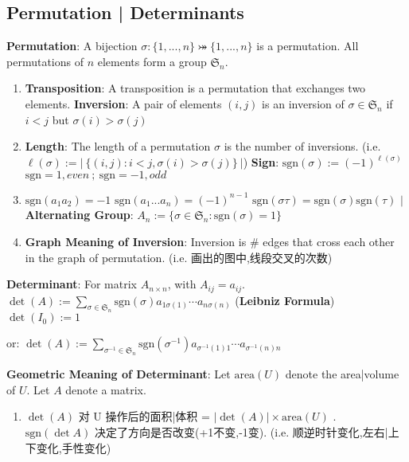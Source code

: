 \documentclass[9pt]{article}
\begin{document}
\subsection{Permutation | Determinants} %

\textbf{Permutation}: A bijection $\sigma:\{1,...,n\}\bij\{1,...,n\}$ is a permutation. \qquad \qquad All permutations of $n$ elements form a group $\mathfrak{S}_n$.

\begin{enumerate}[itemsep=-2pt, topsep=-2pt]
    \item {\scriptsize \textbf{Transposition}: A transposition is a permutation that exchanges two elements. \qquad \textbf{Inversion}: A pair of elements $(i,j)$ is an inversion of $\sigma\in\mathfrak{S}_n$ if $i<j$ but $\sigma(i)>\sigma(j)$}
    \item {\scriptsize \textbf{Length}: The length of a permutation $\sigma$ is the number of inversions. (i.e. $\ell(\sigma):=\left|\ \{(i,j):i<j,\sigma(i)>\sigma(j)\}\ \right|$) \qquad \textbf{Sign}: $\text{sgn}(\sigma):=(-1)^{\ell(\sigma)}$ \qquad $\text{sgn}=1,even \ ; \ \text{sgn}=-1,odd$}
    \item $\text{sgn}(a_1a_2)=-1$ \quad $\text{sgn}(a_1...a_n)=(-1)^{n-1}$ \quad $\text{sgn}(\sigma\tau)=\text{sgn}(\sigma)\text{sgn}(\tau)$ \quad $\big|$ \quad \textbf{Alternating Group}: $A_n:=\{\sigma\in\mathfrak{S}_n:\text{sgn}(\sigma)=1\}$
    \item \textbf{Graph Meaning of Inversion}: {\small Inversion is \# edges that cross each other in the graph of permutation. {\footnotesize (i.e. 画出的图中,线段交叉的次数)}}
\end{enumerate}

\textbf{Determinant}: For matrix $A_{n\times n}$, with $A_{ij}=a_{ij}$. \quad $\det(A):=\sum_{\sigma\in\mathfrak{S}_n}\text{sgn}(\sigma)a_{1\sigma(1)}\cdots a_{n\sigma(n)}$ (\textbf{Leibniz Formula}) \qquad $\det(I_0):=1$

\hspace{200pt} {\scriptsize or:} $\det(A):=\sum_{\sigma^{-1}\in\mathfrak{S}_n}\text{sgn}(\sigma^{-1})a_{\sigma^{-1}(1)1}\cdots a_{\sigma^{-1}(n)n}$

\textbf{Geometric Meaning of Determinant}: Let $\text{area}(U)$ denote the area|volume of $U$. \quad Let $A$ denote a matrix.
\begin{enumerate}[itemsep=-2pt, topsep=-2pt]
    \item {\footnotesize $\det(A)$ 对 U 操作后的面积|体积 = $|\det(A)|\times\text{area}(U)$} . \ {\footnotesize $\text{sgn}(\det A)$ 决定了方向是否改变(+1不变,-1变). {\scriptsize (i.e. 顺逆时针变化,左右|上下变化,手性变化)}}
\end{enumerate}
\end{document}
